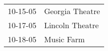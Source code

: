 \begin{supertabular}{p{0.07\textwidth}p{0.23\textwidth}}
 10-15-05 &  Georgia Theatre \\
 10-17-05 &  Lincoln Theatre \\
 10-18-05 &       Music Farm \\
\end{supertabular}
